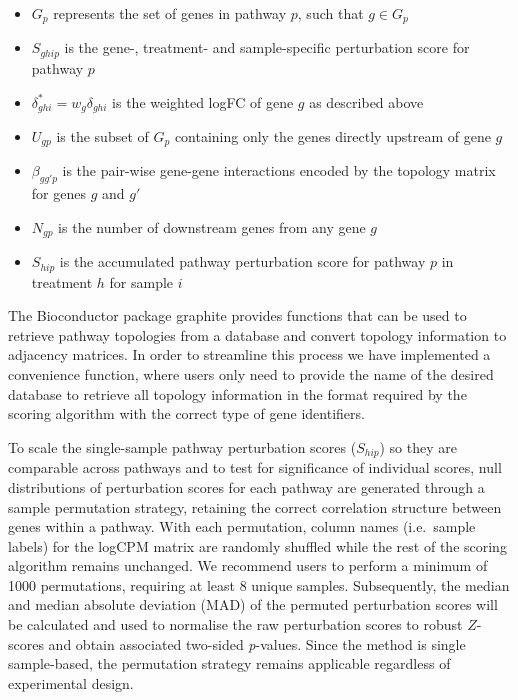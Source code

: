 \documentclass[9pt,a4paper,]{extarticle}
\begin{document}
\begin{itemize}
\item
  \(G_p\) represents the set of genes in pathway \(p\), such that \(g \in G_p\)
\item
  \(S_{ghip}\) is the gene-, treatment- and sample-specific perturbation score for pathway \(p\)
\item
  \(\delta_{ghi}^* = w_g\delta_{ghi}\) is the weighted logFC of gene \(g\) as described above
\item
  \(U_{gp}\) is the subset of \(G_p\) containing only the genes directly upstream of gene \(g\)
\item
  \(\beta_{gg'p}\) is the pair-wise gene-gene interactions\citep{Tarca2009} encoded by the topology matrix for genes \(g\) and \(g'\)
\item
  \(N_{gp}\) is the number of downstream genes from any gene \(g\)
\item
  \(S_{hip}\) is the accumulated pathway perturbation score for pathway \(p\) in treatment \(h\) for sample \(i\)
\end{itemize}

The Bioconductor package graphite\citep{Sales2012} provides functions that can be used to retrieve pathway topologies from a database and convert topology information to adjacency matrices.
In order to streamline this process we have implemented a convenience function, where users only need to provide the name of the desired database to retrieve all topology information in the format required by the scoring algorithm with the correct type of gene identifiers.

To scale the single-sample pathway perturbation scores (\(S_{hip}\)) so they are comparable across pathways and to test for significance of individual scores, null distributions of perturbation scores for each pathway are generated through a sample permutation strategy, retaining the correct correlation structure between genes within a pathway.
With each permutation, column names (i.e.~sample labels) for the logCPM matrix are randomly shuffled while the rest of the scoring algorithm remains unchanged.
We recommend users to perform a minimum of 1000 permutations, requiring at least 8 unique samples.
Subsequently, the median and median absolute deviation (MAD) of the permuted perturbation scores will be calculated and used to normalise the raw perturbation scores to robust \(Z\)-scores and obtain associated two-sided \emph{p}-values.
Since the method is single sample-based, the permutation strategy remains applicable regardless of experimental design.
\end{document}
